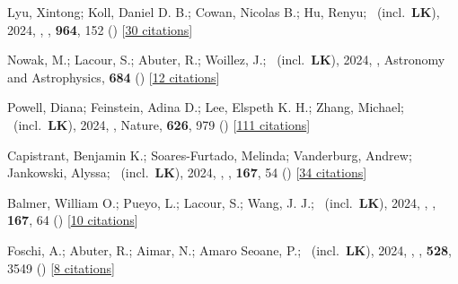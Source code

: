 \item[{\color{numcolor}\scriptsize105}] Lyu, Xintong; Koll, Daniel D. B.; Cowan, Nicolas B.; Hu, Renyu; \etal\ (incl.\ \textbf{LK}), 2024, , \apj, \textbf{964}, 152 () [\href{https://ui.adsabs.harvard.edu/abs/2024ApJ...964..152L}{30 citations}]

\item[{\color{numcolor}\scriptsize104}] Nowak, M.; Lacour, S.; Abuter, R.; Woillez, J.; \etal\ (incl.\ \textbf{LK}), 2024, , Astronomy and Astrophysics, \textbf{684} () [\href{https://ui.adsabs.harvard.edu/abs/2024A&A...684A.184N}{12 citations}]

\item[{\color{numcolor}\scriptsize103}] Powell, Diana; Feinstein, Adina D.; Lee, Elspeth K. H.; Zhang, Michael; \etal\ (incl.\ \textbf{LK}), 2024, , Nature, \textbf{626}, 979 () [\href{https://ui.adsabs.harvard.edu/abs/2024Natur.626..979P}{111 citations}]

\item[{\color{numcolor}\scriptsize102}] Capistrant, Benjamin K.; Soares-Furtado, Melinda; Vanderburg, Andrew; Jankowski, Alyssa; \etal\ (incl.\ \textbf{LK}), 2024, , \aj, \textbf{167}, 54 () [\href{https://ui.adsabs.harvard.edu/abs/2024AJ....167...54C}{34 citations}]

\item[{\color{numcolor}\scriptsize101}] Balmer, William O.; Pueyo, L.; Lacour, S.; Wang, J. J.; \etal\ (incl.\ \textbf{LK}), 2024, , \aj, \textbf{167}, 64 () [\href{https://ui.adsabs.harvard.edu/abs/2024AJ....167...64B}{10 citations}]

\item[{\color{numcolor}\scriptsize100}] Foschi, A.; Abuter, R.; Aimar, N.; Amaro Seoane, P.; \etal\ (incl.\ \textbf{LK}), 2024, , \mnras, \textbf{528}, 3549 () [\href{https://ui.adsabs.harvard.edu/abs/2024MNRAS.528.3549F}{8 citations}]


